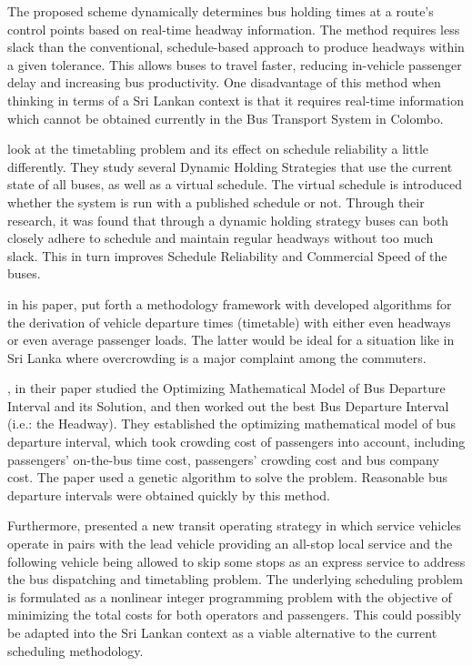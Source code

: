 \documentclass[12pt, oneside]{report}
\begin{document}
The proposed scheme dynamically determines bus holding times at a route’s control points based on real-time headway information. The method requires less slack than the conventional, schedule-based approach to produce headways within a given tolerance. This allows buses to travel faster, reducing in-vehicle passenger delay and increasing bus productivity. One disadvantage of this method when thinking in terms of a Sri Lankan context is that it requires real-time information which cannot be obtained currently in the Bus Transport System in Colombo.

\citet{Xuan2011} look at the timetabling problem and its effect on schedule reliability a little differently. They study several Dynamic Holding Strategies that use the current state of all buses, as well as a virtual schedule. The virtual schedule is introduced whether the system is run with a 
published schedule or not. Through their research, it was found that through a dynamic holding strategy buses can both closely adhere to schedule and maintain regular headways without too much slack. This in turn improves Schedule Reliability and Commercial Speed of the buses.

\citet{Ceder2009} in his paper, put forth a methodology framework with developed algorithms for the derivation of vehicle departure times (timetable) with either even headways or even average passenger loads. The latter would be ideal for a situation like in Sri Lanka where overcrowding is a major complaint among the commuters.

\citet{Qian2013}, in their paper studied the Optimizing Mathematical Model of Bus Departure Interval and its Solution, and then worked out the best Bus Departure Interval (i.e.: the Headway). They established the optimizing mathematical model of bus departure interval, which took crowding cost of passengers into account, including passengers’ on-the-bus time cost, passengers’ crowding cost and bus company cost. The paper used a genetic algorithm to solve the problem. Reasonable bus departure intervals were obtained quickly by this method.

Furthermore, \citet{Fu2003} presented a new transit operating strategy in which service vehicles operate in pairs with the lead vehicle providing an all-stop local service and the following vehicle being allowed to skip some stops as an express service to address the bus dispatching and timetabling problem. The underlying scheduling problem is formulated as a nonlinear integer programming problem with the objective of minimizing the total costs for both operators and passengers. This could possibly be adapted into the Sri Lankan context as a viable alternative to the current scheduling methodology.
\end{document}
